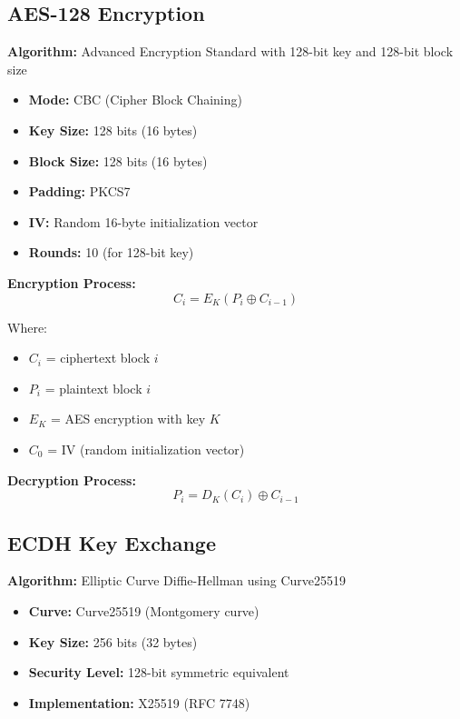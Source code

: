 \documentclass[12pt,a4paper]{report}
\begin{document}
\subsection{AES-128 Encryption}

\textbf{Algorithm:} Advanced Encryption Standard with 128-bit key and 128-bit block size

\begin{itemize}
    \item \textbf{Mode:} CBC (Cipher Block Chaining)
    \item \textbf{Key Size:} 128 bits (16 bytes)
    \item \textbf{Block Size:} 128 bits (16 bytes)
    \item \textbf{Padding:} PKCS7
    \item \textbf{IV:} Random 16-byte initialization vector
    \item \textbf{Rounds:} 10 (for 128-bit key)
\end{itemize}

\textbf{Encryption Process:}
\begin{equation}
C_i = E_K(P_i \oplus C_{i-1})
\end{equation}

Where:
\begin{itemize}
    \item $C_i$ = ciphertext block $i$
    \item $P_i$ = plaintext block $i$
    \item $E_K$ = AES encryption with key $K$
    \item $C_0$ = IV (random initialization vector)
\end{itemize}

\textbf{Decryption Process:}
\begin{equation}
P_i = D_K(C_i) \oplus C_{i-1}
\end{equation}

\subsection{ECDH Key Exchange}

\textbf{Algorithm:} Elliptic Curve Diffie-Hellman using Curve25519

\begin{itemize}
    \item \textbf{Curve:} Curve25519 (Montgomery curve)
    \item \textbf{Key Size:} 256 bits (32 bytes)
    \item \textbf{Security Level:} 128-bit symmetric equivalent
    \item \textbf{Implementation:} X25519 (RFC 7748)
\end{itemize}
\end{document}
